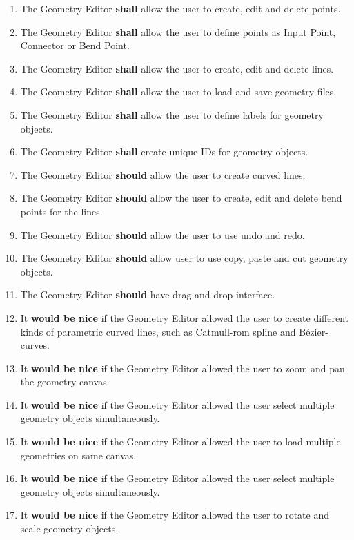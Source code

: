 \begin{enumerate}
	\item The Geometry Editor \textbf{shall} allow the user to create, edit and delete points.
	\item The Geometry Editor \textbf{shall} allow the user to define points as Input Point, Connector or Bend Point.
	\item The Geometry Editor \textbf{shall} allow the user to create, edit and delete lines.
	\item The Geometry Editor \textbf{shall} allow the user to load and save geometry files.
	\item The Geometry Editor \textbf{shall} allow the user to define labels for geometry objects.
	\item The Geometry Editor \textbf{shall} create unique IDs for geometry objects.
	\item The Geometry Editor \textbf{should} allow the user to create curved lines.
	\item The Geometry Editor \textbf{should} allow the user to create, edit and delete bend points for the lines.
	\item The Geometry Editor \textbf{should} allow the user to use undo and redo.
	\item The Geometry Editor \textbf{should} allow user to use copy, paste and cut geometry objects.
	\item The Geometry Editor \textbf{should} have drag and drop interface.
	\item It \textbf{would be nice} if the Geometry Editor allowed the user to create different kinds of parametric curved lines, such as Catmull-rom spline and Bézier-curves.
	\item It \textbf{would be nice} if the Geometry Editor allowed the user to zoom and pan the geometry canvas.
	\item It \textbf{would be nice} if the Geometry Editor allowed the user select multiple geometry objects simultaneously.
	\item It \textbf{would be nice} if the Geometry Editor allowed the user to load multiple geometries on same canvas.
	\item It \textbf{would be nice} if the Geometry Editor allowed the user select multiple geometry objects simultaneously.
	\item It \textbf{would be nice} if the Geometry Editor allowed the user to rotate and scale geometry objects.
\end{enumerate}

